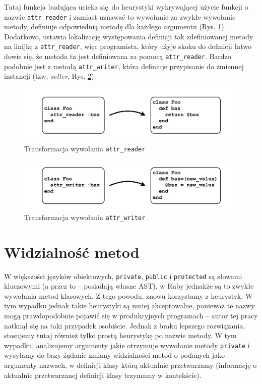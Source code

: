 \documentclass[shortabstract,mgr]{iithesis}
\begin{document}
Tutaj funkcja budująca ucieka się do heurystyki wykrywającej użycie funkcji o nazwie \texttt{attr\_reader} i zamiast uznawać to wywołanie za zwykłe wywołanie metody, definiuje odpowiednią metodę dla każdego argumentu (Rys. \ref{fig:attr-reader}). Dodatkowo, ustawia lokalizację występowania definicji tak zdefiniowanej metody na linijkę z \texttt{attr\_reader}, więc programista, który użyje skoku do definicji łatwo dowie się, że metoda ta jest definiowana za pomocą \texttt{attr\_reader}. Bardzo podobnie jest z metodą \texttt{attr\_writer}, która definiuje przypisanie do zmiennej instancji (tzw. \textit{setter}, Rys. \ref{fig:attr-writer}).

\begin{figure}[htb]
	\centering
	\includegraphics[scale=0.6]{imgs/attr-reader.png}
	\caption{Transformacja wywołania \texttt{attr\_reader}}
	\label{fig:attr-reader}
\end{figure}

\begin{figure}[htb]
	\centering
	\includegraphics[scale=0.6]{imgs/attr-writer.png}
	\caption{Transformacja wywołania \texttt{attr\_writer}}
	\label{fig:attr-writer}
\end{figure}

\section{Widzialność metod}

W większości języków obiektowych, \texttt{private}, \texttt{public} i \texttt{protected} są słowami kluczowymi (a przez to -- posiadają własne AST), w Ruby jednakże są to zwykłe wywołania metod klasowych. Z tego powodu, znowu korzystamy z heurystyk. W tym wypadku jednak takie heurystyki są mniej akceptowalne, ponieważ te nazwy mogą prawdopodobnie pojawić się w produkcyjnych programach -- autor tej pracy natknął się na taki przypadek osobiście. Jednak z braku lepszego rozwiązania, stosujemy tutaj również tylko prostą heurystykę po nazwie metody. W tym wypadku, analizujemy argumenty jakie otrzymuje wywołanie metody \texttt{private} i wysyłamy do bazy żądanie zmiany widzialności metod o podanych jako argumenty nazwach, w definicji klasy którą aktualnie przetwarzamy (informację o aktualnie przetwarzanej definicji klasy trzymamy w kontekście).
\end{document}
